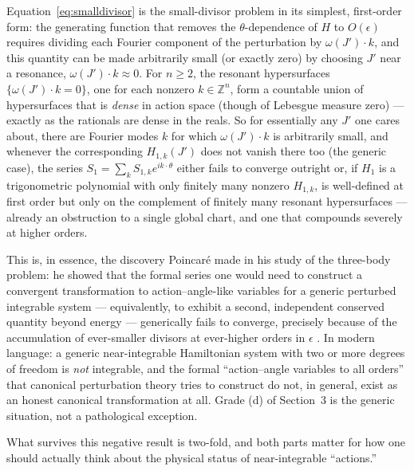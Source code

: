 \documentclass[11pt]{article}
\begin{document}
Equation~\eqref{eq:smalldivisor} is the small-divisor problem in its simplest, first-order form: the generating function that removes the $\theta$-dependence of $H$ to $O(\epsilon)$ requires dividing each Fourier component of the perturbation by $\omega(J')\cdot k$, and this quantity can be made arbitrarily small (or exactly zero) by choosing $J'$ near a resonance, $\omega(J')\cdot k\approx0$. For $n\ge2$, the resonant hypersurfaces $\{\omega(J')\cdot k=0\}$, one for each nonzero $k\in\mathbb Z^n$, form a countable union of hypersurfaces that is \emph{dense} in action space (though of Lebesgue measure zero) --- exactly as the rationals are dense in the reals. So for essentially any $J'$ one cares about, there are Fourier modes $k$ for which $\omega(J')\cdot k$ is arbitrarily small, and whenever the corresponding $H_{1,k}(J')$ does not vanish there too (the generic case), the series $S_1=\sum_k S_{1,k}e^{ik\cdot\theta}$ either fails to converge outright or, if $H_1$ is a trigonometric polynomial with only finitely many nonzero $H_{1,k}$, is well-defined at first order but only on the complement of finitely many resonant hypersurfaces --- already an obstruction to a single global chart, and one that compounds severely at higher orders.

This is, in essence, the discovery Poincar\'e made in his study of the three-body problem: he showed that the formal series one would need to construct a convergent transformation to action--angle-like variables for a generic perturbed integrable system --- equivalently, to exhibit a second, independent conserved quantity beyond energy --- generically fails to converge, precisely because of the accumulation of ever-smaller divisors at ever-higher orders in $\epsilon$ \cite{Poincare1892}. In modern language: a generic near-integrable Hamiltonian system with two or more degrees of freedom is \emph{not} integrable, and the formal ``action--angle variables to all orders'' that canonical perturbation theory tries to construct do not, in general, exist as an honest canonical transformation at all. Grade (d) of Section~3 is the generic situation, not a pathological exception.

What survives this negative result is two-fold, and both parts matter for how one should actually think about the physical status of near-integrable ``actions.''
\end{document}
